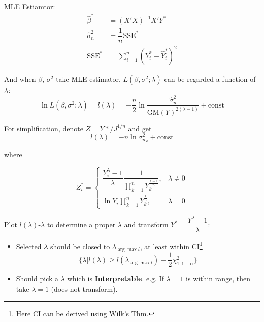 \begin{itemize}[topsep=2pt,itemsep=2pt]
        

        MLE Estiamtor:
        \begin{align*}
            \hat{\beta }^*&= (X'X)^{-1}X'Y^*\\
            \hat{\sigma }^2_n&=\dfrac{1}{n}\mathrm{SSE}^*\\
            \mathrm{SSE}^*&=\sum_{i=1}^n(Y_i^*-\hat{Y}_i^*)^2
        \end{align*}

        And when $ \beta  $, $ \sigma ^2 $ take MLE estimator, $ L(\beta ,\sigma ^2;\lambda ) $ can be regarded a function of $ \lambda  $:
        \begin{equation}
            \ln L(\beta ,\sigma ^2;\lambda )=l(\lambda )=-\dfrac{n}{2}\ln \dfrac{\hat{\sigma}^2_n}{\mathrm{GM}(Y)^{2(\lambda -1)}}+\mathrm{const}
        \end{equation}

        For simplification, denote $ Z=Y*/J^{1/n} $ and get
        \begin{equation}
            l(\lambda )=-n\ln \sigma^2_{n_Z}+\mathrm{const} 
        \end{equation}
        
        where 

        \begin{equation}
            Z_i^* =\begin{cases}
                \dfrac{Y_i^\lambda-1 }{\lambda }\dfrac{1}{\prod\limits_{k=1}^n Y_k^{\frac{\lambda -1}{n}}},&\lambda \neq 0\\
                \ln Y_i\prod\limits_{k=1}^n Y_k^{\frac{1}{n}},&\lambda =0
            \end{cases}
        \end{equation}

        Plot $ l(\lambda ) $-$ \lambda  $ to determine a proper $ \lambda  $ and transform $ Y^*=\dfrac{Y^\lambda -1}{\lambda } $:
        \begin{itemize}[topsep=2pt,itemsep=2pt]
            \item Selected $ \lambda $ should be closed to $ \lambda_{\arg\max l} $, at least within CI\footnote{Here CI can be derived using Wilk's Thm.}
            \begin{equation}
                \{\lambda |l(\lambda )\geq l(\lambda_{\arg\max l})-\dfrac{1}{2}\chi^2_{1,1-\alpha }\}
            \end{equation}
            \item Should pick a $ \lambda  $ which is \textbf{Interpretable}. e.g. If $ \lambda =1 $ is within range, then take $ \lambda =1 $ (does not transform).
            

\end{itemize}
\end{itemize}
